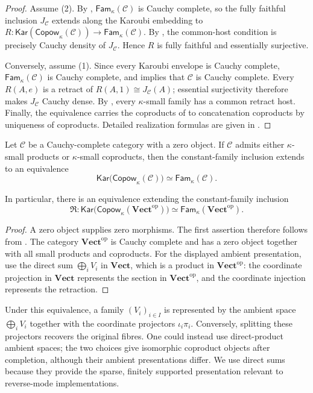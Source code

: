 \documentclass[runningheads,envcountsame]{llncs}
\newcommand{\Vect}{\mathbf{Vect}}
\newcommand{\Vectop}{\mathbf{Vect}^{\mathrm{op}}}
\newcommand{\Copow}{\mathsf{Copow}}
\newcommand{\Fam}{\mathsf{Fam}}
\newcommand{\Kar}{\mathsf{Kar}}
\newcommand{\Rlz}{\mathfrak R}
\begin{document}
\begin{proof}
Assume (2). By , $\Fam_\kappa(\mathcal C)$ is Cauchy
complete, so the fully faithful inclusion $J_{\mathcal C}$ extends along the
Karoubi embedding to
$R:\Kar(\Copow_\kappa(\mathcal C))\to\Fam_\kappa(\mathcal C)$.
By , the common-host condition is
precisely Cauchy density of $J_{\mathcal C}$. Hence $R$ is fully faithful and
essentially surjective.

Conversely, assume (1). Since every Karoubi envelope is Cauchy complete,
$\Fam_\kappa(\mathcal C)$ is Cauchy complete, and 
implies that $\mathcal C$ is Cauchy complete. Every $R(A,e)$ is a retract of
$R(A,1)\cong J_{\mathcal C}(A)$; essential surjectivity therefore makes
$J_{\mathcal C}$ Cauchy dense. By , every
$\kappa$-small family has a common retract host. Finally, the equivalence
carries the coproducts of  to concatenation coproducts
by uniqueness of coproducts. Detailed realization formulas are given in
.
\end{proof}




\begin{corollary}
\label{cor:vect}
Let $\mathcal C$ be a Cauchy-complete category with a zero object. If
$\mathcal C$ admits either $\kappa$-small products or $\kappa$-small
coproducts, then the constant-family inclusion extends to an equivalence
$$
\Kar\bigl(\Copow_\kappa(\mathcal C)\bigr)
\simeq
\Fam_\kappa(\mathcal C).
$$

\noindent In particular, there is an equivalence extending the constant-family inclusion
$$
\Rlz:
\Kar\bigl(\Copow_\kappa(\Vectop)\bigr)
\simeq
\Fam_\kappa(\Vectop).
$$
\end{corollary}

\begin{proof}
A zero object supplies zero morphisms. The first assertion therefore follows
from . The category
$\Vectop$ is Cauchy complete and has a zero object together with all small
products and coproducts. For the displayed ambient presentation, use the direct
sum $\bigoplus_iV_i$ in $\Vect$, which is a product in $\Vectop$: the
coordinate projection in $\Vect$ represents the section in $\Vectop$, and
the coordinate injection represents the retraction.
\end{proof}

Under this equivalence, a family $(V_i)_{i\in I}$ is represented by the
ambient space $\bigoplus_iV_i$ together with the coordinate projectors
$\iota_i\pi_i$. Conversely, splitting these projectors recovers the original
fibres. One could instead use direct-product ambient spaces; the two choices
give isomorphic coproduct objects after completion, although their ambient
presentations differ. We use direct sums because they provide the sparse,
finitely supported presentation relevant to reverse-mode implementations.
\end{document}
